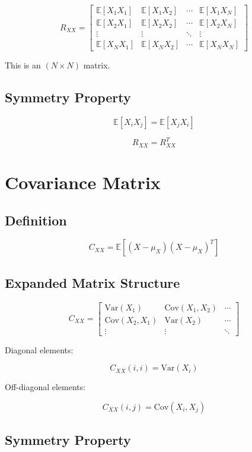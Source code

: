 \documentclass{article}
\begin{document}
\[
R_{XX} =
\begin{bmatrix}
\mathbb{E}[X_1 X_1] & \mathbb{E}[X_1 X_2] & \cdots & \mathbb{E}[X_1 X_N] \\
\mathbb{E}[X_2 X_1] & \mathbb{E}[X_2 X_2] & \cdots & \mathbb{E}[X_2 X_N] \\
\vdots & \vdots & \ddots & \vdots \\
\mathbb{E}[X_N X_1] & \mathbb{E}[X_N X_2] & \cdots & \mathbb{E}[X_N X_N]
\end{bmatrix}
\]

This is an $(N \times N)$ matrix.

\subsection{Symmetry Property}

\[
\mathbb{E}[X_i X_j] = \mathbb{E}[X_j X_i]
\]

\[
R_{XX} = R_{XX}^T
\]

\section{Covariance Matrix}

\subsection{Definition}

\[
C_{XX} = \mathbb{E}[(X - \mu_X)(X - \mu_X)^T]
\]

\subsection{Expanded Matrix Structure}

\[
C_{XX} =
\begin{bmatrix}
\mathrm{Var}(X_1) & \mathrm{Cov}(X_1, X_2) & \cdots \\
\mathrm{Cov}(X_2, X_1) & \mathrm{Var}(X_2) & \cdots \\
\vdots & \vdots & \ddots
\end{bmatrix}
\]

Diagonal elements:

\[
C_{XX}(i,i) = \mathrm{Var}(X_i)
\]

Off-diagonal elements:

\[
C_{XX}(i,j) = \mathrm{Cov}(X_i, X_j)
\]

\subsection{Symmetry Property}
\end{document}
